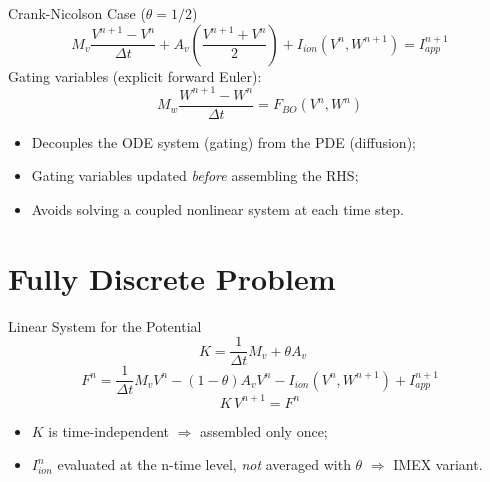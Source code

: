 \documentclass{beamer}
\begin{document}
\begin{frame}{Crank-Nicolson Case ($\theta = 1/2$)}
\[
M_v\frac{V^{n+1}-V^n}{\Delta t} + A_v\left(\frac{V^{n+1}+V^n}{2}\right)
 + I_{ion}(V^n,W^{n+1}) = I_{app}^{n+1}
\]
\vspace{6pt}
Gating variables (explicit forward Euler):
\[
M_w\frac{W^{n+1}-W^n}{\Delta t} = F_{BO}(V^n,W^n)
\]
\begin{itemize}
  \item Decouples the ODE system (gating) from the PDE (diffusion);
  \item Gating variables updated \emph{before} assembling the RHS;
  \item Avoids solving a coupled nonlinear system at each time step.
\end{itemize}
\end{frame}

\section{Fully Discrete Problem}

\begin{frame}{Linear System for the Potential}
\[
K = \frac{1}{\Delta t}M_v + \theta A_v \quad %
\]
\[
F^n = \frac{1}{\Delta t}M_vV^n - (1-\theta)A_vV^n - I_{ion}(V^n,W^{n+1}) + I_{app}^{n+1}
\]
\[
K\,V^{n+1} = F^n
\]
\begin{itemize}
  \item $K$ is time-independent $\Rightarrow$ assembled only once;
  \item $I_{ion}^n$ evaluated at the n-time level, \emph{not} averaged with $\theta$
        $\Rightarrow$ IMEX variant.
\end{itemize}
\end{frame}

\end{document}
